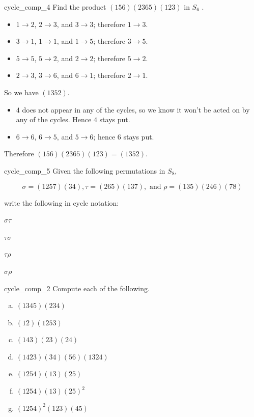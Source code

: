 \begin{example}{cycle_comp_4}
Find the product $(156)(2365)(123)$  in $S_6$ .
\begin{itemize}
\item
$1 \to 2$, $2 \to 3$, and $3 \to 3$; therefore $1 \to 3$.
\item
$3 \to 1$, $1 \to 1$, and $1 \to 5$; therefore $3 \to 5$.
\item
$5 \to 5$, $5 \to 2$, and $2 \to 2$; therefore $5 \to 2$.
\item
$2 \to 3$, $3 \to 6$, and $6 \to 1$; therefore $2 \to 1$.
\end{itemize}

\noindent
So we have $(1352)$.

\begin{itemize}
\item
$4$ does not appear in any of the cycles, so we know it won't be acted on by any of the cycles.  Hence $4$ stays put.
\item
$6 \to 6$, $6 \to 5$, and $5 \to 6$; hence $6$ stays put.
\end{itemize}

\noindent
Therefore $(156)(2365)(123) = (1352)$.
\end{example}

\begin{exercise}{cycle_comp_5}
Given the following permutations in $S_8$, 

\[  \sigma = (1257)(34) , \tau = (265)(137), \text { and } \rho = (135)(246)(78) \]

\noindent
write the following in cycle notation:
\begin{enumerate}[(a)]
\begin{multicols}{2}
\item
$\sigma \tau$
\item
$\tau \sigma$
\item
$\tau \rho$
\item
$\sigma \rho$
\end{multicols}
\end{enumerate}
\end{exercise}



\begin{exercise}{cycle_comp_2}
Compute each of the following.
\begin{multicols}{3}
\begin{enumerate}[(a)]
 \item
$(1345)(234)$
\item
$(12)(1253)$
\item
$(143)(23)(24)$
\item
$(1423)(34)(56)(1324)$
\item
$(1254)(13)(25)$
\item
$(1254) (13)(25)^2$
\item
$(1254)^2 (123)(45)$
\end{enumerate}
\end{multicols}
\end{exercise}


